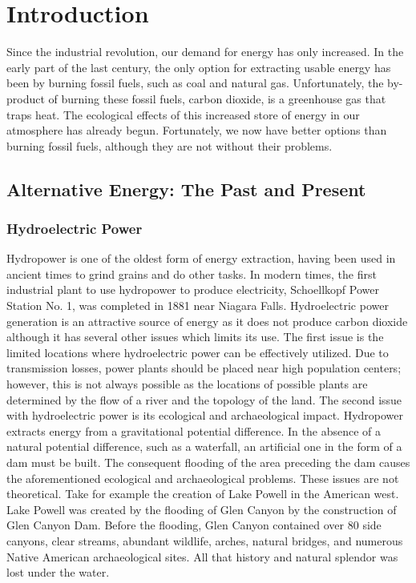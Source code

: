 \chapter{Introduction}\label{chap:intro}

Since the industrial revolution, our demand for energy has only increased.
In the early part of the last century, the only option for extracting usable energy has been by burning fossil fuels, such as coal and natural gas. Unfortunately, the by-product of burning these fossil fuels, carbon dioxide, is a greenhouse gas that traps heat. The ecological effects of this increased store of energy in our atmosphere has already begun. 
Fortunately, we now have better options than burning fossil fuels, although they are not without their problems.

\section{Alternative Energy: The Past and Present}
\subsection{Hydroelectric Power}
Hydropower is one of the oldest form of energy extraction, having been used in ancient times to grind grains and do other tasks. In modern times, the first industrial plant to use hydropower to produce electricity, Schoellkopf Power Station No. 1, was completed in 1881 near Niagara Falls\cite{schoellkopf}. Hydroelectric power generation is an attractive source of energy as it does not produce carbon dioxide although it has several other issues which limits its use. The first issue is the limited locations where hydroelectric power can be effectively utilized. Due to transmission losses, power plants should be placed near high population centers; however, this is not always possible as the locations of possible plants are determined by the flow of a river and the topology of the land. The second issue with hydroelectric power is its ecological and archaeological impact. Hydropower extracts energy from a gravitational potential difference. In the absence of a natural potential difference, such as a waterfall, an artificial one in the form of a dam must be built. The consequent flooding of the area preceding the dam causes the aforementioned ecological and archaeological problems. These issues are not theoretical. Take for example the creation of Lake Powell in the American west. Lake Powell was created by the flooding of Glen Canyon by the construction of Glen Canyon Dam. Before the flooding, Glen Canyon contained over 80 side canyons, clear streams, abundant wildlife, arches, natural bridges, and numerous Native American archaeological sites. All that history and natural splendor was lost under the water.

